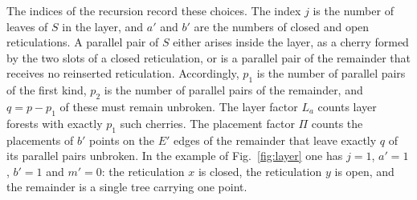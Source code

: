 \documentclass[11pt,a4paper]{article}
\theoremstyle{definition}
\begin{document}
The indices of the recursion record these choices. The index $j$ is the number of leaves of $S$ in the layer, and $a'$ and $b'$ are the numbers of closed and open reticulations. A parallel pair of $S$ either arises inside the layer, as a cherry formed by the two slots of a closed reticulation, or is a parallel pair of the remainder that receives no reinserted reticulation. Accordingly, $p_1$ is the number of parallel pairs of the first kind, $p_2$ is the number of parallel pairs of the remainder, and $q=p-p_1$ of these must remain unbroken. The layer factor $L_a$ counts layer forests with exactly $p_1$ such cherries. The placement factor $\Pi$ counts the placements of $b'$ points on the $E'$ edges of the remainder that leave exactly $q$ of its parallel pairs unbroken. In the example of Fig.~\ref{fig:layer} one has $j=1$, $a'=1$, $b'=1$ and $m'=0$: the reticulation $x$ is closed, the reticulation $y$ is open, and the remainder is a single tree carrying one point.
\end{document}
